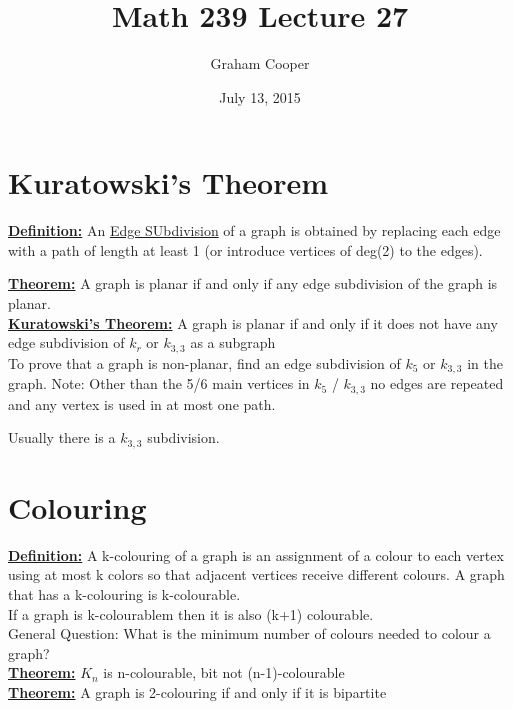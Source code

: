 \documentclass[12pt]{article}
\title{\vspace{-15ex}Math 239 Lecture 27\vspace{-1ex}}
\date{July 13, 2015}
\author{Graham Cooper}
\newcommand{\myt}[1]{\textbf{\underline{#1}}}
\begin{document}
	\maketitle
	
	\section*{Kuratowski's Theorem}
	
	\myt{Definition:} An \underline{Edge SUbdivision} of a graph is obtained by replacing each edge with a path of length at least 1 (or introduce vertices of deg(2) to the edges).
	
	\myt{Theorem:} A graph is planar if and only if any edge subdivision of the graph is planar.\\
	
	\myt{Kuratowski's Theorem:} A graph is planar if and only if it does not have any edge subdivision of $k_r$ or $k_{3,3}$ as a subgraph\\
	
	To prove that a graph is non-planar, find an edge subdivision of $k_5$ or $k_{3,3}$ in the graph. Note: Other than the 5/6 main vertices in $k_5$ / $k_{3,3}$ no edges are repeated and any vertex is used in at most one path.
	
	Usually there is a $k_{3,3}$ subdivision.\\
	
	\section*{Colouring}
	
	\myt{Definition:} A k-colouring of a graph is an assignment of a colour to each vertex using at most k colors so that adjacent vertices receive different colours. A graph that has a k-colouring is k-colourable.\\
	
	If a graph is k-colourablem then it is also (k+1) colourable.\\
	
	General Question: What is the minimum number of colours needed to colour a graph?\\
	
	\myt{Theorem:} $K_n$ is n-colourable, bit not (n-1)-colourable\\
	\myt{Theorem:} A graph is 2-colouring if and only if it is bipartite\\
	
	
	
	
\end{document}
